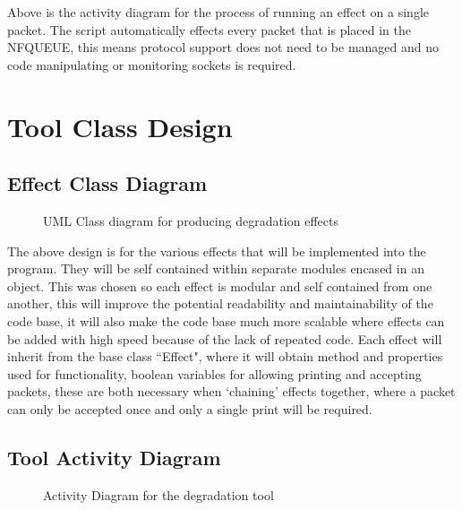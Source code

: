 Above is the activity diagram for the process of running an effect on a single packet. The script automatically effects every packet that is placed in the NFQUEUE, this means protocol support does not need to be managed and no code manipulating or monitoring sockets is required.

%
\section{Tool Class Design}
\subsection{Effect Class Diagram}

\begin{center}
	
	\begin{figure}[h]
		\caption{UML Class diagram for producing degradation effects}
	\end{figure}
\end{center}

The above design is for the various effects that will be implemented into the program. They will be self contained within separate modules encased in an object. This was chosen so each effect is modular and self contained from one another, this will improve the potential readability and maintainability of the code base, it will also make the code base much more scalable where effects can be added with high speed because of the lack of repeated code.  Each effect will inherit from the base class ``Effect", where it will obtain method and properties used for functionality, boolean variables for allowing printing and accepting packets, these are both necessary when `chaining' effects together, where a packet can only be accepted once and only a single print will be required.

\subsection{Tool Activity Diagram}
\begin{center}
	
	\begin{figure}[h]
		\caption{Activity Diagram for the degradation tool}
		\label{ref:ToolAD}
	\end{figure}
\end{center}

